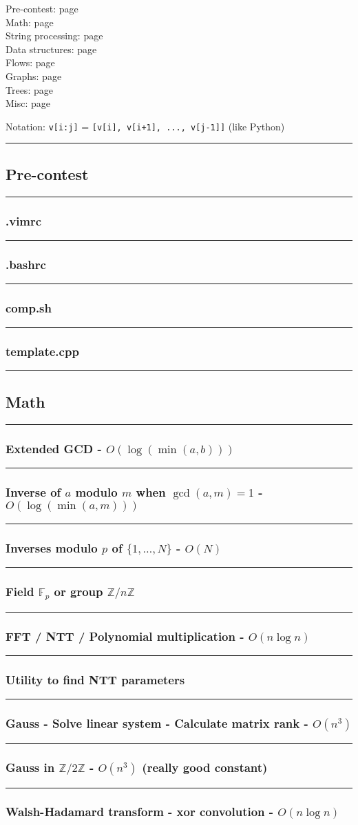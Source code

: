 \documentclass[landscape,a4paper,twocolumn,10pt]{report}
\renewcommand{\line}{\noindent\rule{\linewidth}{1pt}}
\newcommand{\algosection}[1]{\line \subsection*{#1}}
\newcommand{\algorithm}[1]{\line \subsubsection*{#1}}
\begin{document}
\footnotesize

\noindent
Pre-contest: page \pageref{precontest} \\
Math: page \pageref{math} \\
String processing: page \pageref{string} \\
Data structures: page \pageref{datastruct} \\
Flows: page \pageref{flows} \\
Graphs: page \pageref{graphs} \\
Trees: page \pageref{trees} \\
Misc: page \pageref{misc}

\noindent
Notation: \verb#v[i:j]# = \verb#[v[i], v[i+1], ..., v[j-1]]# (like Python)

\algosection{Pre-contest}
\label{precontest}

\algorithm{.vimrc}


\algorithm{.bashrc}


\algorithm{comp.sh}


\algorithm{template.cpp}


\algosection{Math}
\label{math}

\algorithm{Extended GCD - $O(\log(\min(a, b)))$}


\algorithm{Inverse of $a$ modulo $m$ when $\operatorname{gcd}(a, m) = 1$ - $O(\log(\min(a, m)))$}


\algorithm{Inverses modulo $p$ of $\{1, \dots, N\}$ - $O(N)$}


\algorithm{Field $\mathbb F_p$ or group $\mathbb Z/n\mathbb Z$}


\algorithm{FFT / NTT / Polynomial multiplication - $O(n \log n)$}


\algorithm{Utility to find NTT parameters}


\algorithm{Gauss - Solve linear system - Calculate matrix rank - $O(n^3)$}


\algorithm{Gauss in $\mathbb Z/2\mathbb Z$ - $O(n^3)$ (really good constant)}


\algorithm{Walsh-Hadamard transform - xor convolution - $O(n \log n)$}

\end{document}
